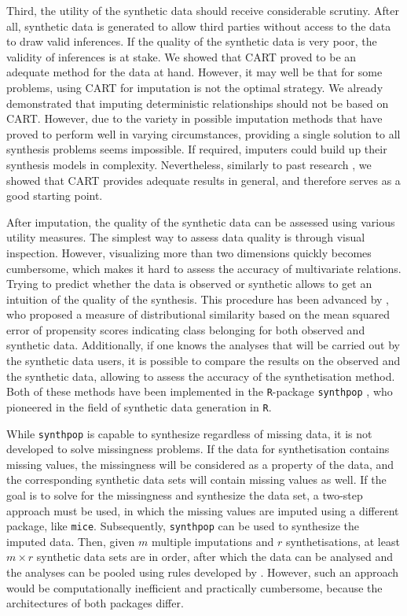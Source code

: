\documentclass[psych,article,submit,moreauthors,pdftex]{mdpi}
\begin{document}
Third, the utility of the synthetic data should receive considerable
scrutiny. After all, synthetic data is generated to allow third parties
without access to the data to draw valid inferences. If the quality of
the synthetic data is very poor, the validity of inferences is at stake.
We showed that CART proved to be an adequate method for the data at
hand. However, it may well be that for some problems, using CART for
imputation is not the optimal strategy. We already demonstrated that
imputing deterministic relationships should not be based on CART.
However, due to the variety in possible imputation methods that have
proved to perform well in varying circumstances, providing a single
solution to all synthesis problems seems impossible. If required,
imputers could build up their synthesis models in complexity.
Nevertheless, similarly to past research
\citep[e.g.,][]{burgette_reiter_cart_2010, doove_buuren_recursive_2014, raab_practical_2016},
we showed that CART provides adequate results in general, and therefore
serves as a good starting point.

After imputation, the quality of the synthetic data can be assessed
using various utility measures. The simplest way to assess data quality
is through visual inspection. However, visualizing more than two
dimensions quickly becomes cumbersome, which makes it hard to assess the
accuracy of multivariate relations. Trying to predict whether the data
is observed or synthetic allows to get an intuition of the quality of
the synthesis. This procedure has been advanced by
\citet{snoke2018general}, who proposed a measure of distributional
similarity based on the mean squared error of propensity scores
indicating class belonging for both observed and synthetic data.
Additionally, if one knows the analyses that will be carried out by the
synthetic data users, it is possible to compare the results on the
observed and the synthetic data, allowing to assess the accuracy of the
synthetisation method. Both of these methods have been implemented in
the \texttt{R}-package \texttt{synthpop} \citep{synthpop}, who pioneered
in the field of synthetic data generation in \texttt{R}.

While \texttt{synthpop} is capable to synthesize regardless of missing
data, it is not developed to solve missingness problems. If the data for
synthetisation contains missing values, the missingness will be
considered as a property of the data, and the corresponding synthetic
data sets will contain missing values as well. If the goal is to solve
for the missingness and synthesize the data set, a two-step approach
must be used, in which the missing values are imputed using a different
package, like \texttt{mice}. Subsequently, \texttt{synthpop} can be used
to synthesize the imputed data. Then, given \(m\) multiple imputations
and \(r\) synthetisations, at least \(m \times r\) synthetic data sets
are in order, after which the data can be analysed and the analyses can
be pooled using rules developed by \citet{reiter2004simultaneous}.
However, such an approach would be computationally inefficient and
practically cumbersome, because the architectures of both packages
differ.
\end{document}
